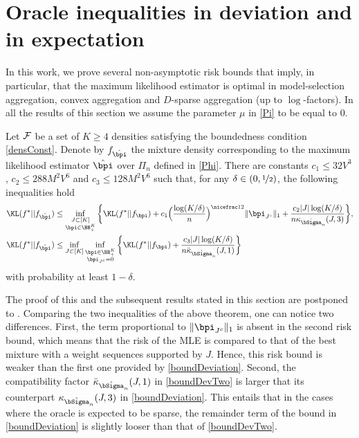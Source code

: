\section{Oracle inequalities in deviation and in expectation} %
\label{sec:main_results}

In this work, we prove several non-asymptotic risk bounds that
imply, in particular, that the maximum likelihood estimator is optimal in model-selection aggregation,
convex aggregation and $D$-sparse aggregation (up to $\log$-factors). In all the results of this section
we assume the parameter $\mu$ in \eqref{Pi} to be equal to $0$.
\begin{theorem}
\label{maintheo1}
Let $\cal F$ be a set of $K\ge 4$ densities satisfying the boundedness condition \eqref{densConst}.
Denote by $f_{\hat\bpi}$ the mixture density corresponding to the maximum likelihood estimator
$\hat\bpi$ over $\Pi_n$ defined in \eqref{Phi}. There are constants $c_1\le 32V^3$,
$c_2\le 288 M^2V^6$ and $c_3\le 128 M^2V^6$ such that, for any $\delta \in (0,\nicefrac12)$, the following
inequalities hold
\begin{align}
  \KL(f^*|| f_{\hat\bpi}) &\leq \inf_{\substack{J\subset [K]\\\bpi \in \BB_+^K}}
  \bigg\{ \KL(f^*|| f_{\bpi}) + c_1\Big(\frac{\log(K/\delta)}{n}\Big)^{\nicefrac12} \|\bpi_{J^c}\|_1 +
			\frac{c_2|J|\log(K/\delta)}{n\kappa_{\hat\bSigma_n}(J,3)} \bigg\},\label{boundDeviation}\\
 \KL(f^*|| f_{\hat\bpi}) &\leq \inf_{J\subset [K]}\inf_{\substack{\bpi \in \BB_+^K\\ \bpi_{J^c}=0}}
            \bigg\{ \KL(f^*|| f_{\bpi}) +\frac{c_3|J|\log(K/\delta)}{n\bar\kappa_{\hat\bSigma_n}(J,1)}
            \bigg\} \label{boundDevTwo}
\end{align}
with probability at least $1-\delta$.
\end{theorem}

The proof of this and the subsequent results stated in this section are postponed to .
Comparing the two inequalities of the above theorem, one can notice two differences. First, the term
proportional to $\|\bpi_{J^c}\|_1$  is absent in the second risk bound, which means that
the risk of the MLE is compared to that of the best mixture with a weight sequences supported by $J$.
Hence, this risk bound is weaker than the first one provided by \eqref{boundDeviation}. Second,
the compatibility factor $\bar\kappa_{\hat\bSigma_n}(J,1)$ in \eqref{boundDevTwo} is larger that
its counterpart $\kappa_{\hat\bSigma_n}(J,3)$ in \eqref{boundDeviation}. This entails that in the cases
where the oracle is expected to be sparse, the remainder term of the bound in \eqref{boundDeviation}
is slightly looser than that of \eqref{boundDevTwo}.


